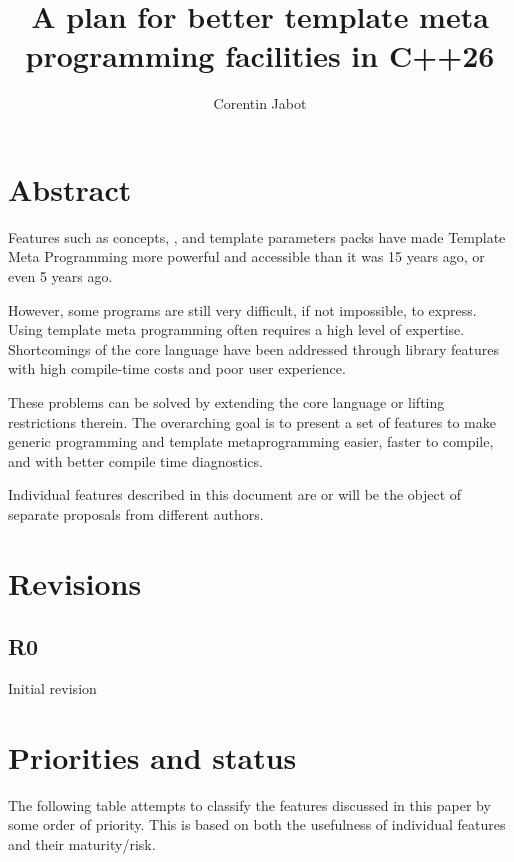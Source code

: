 \documentclass{wg21}
\title{A plan for better template meta programming facilities in C++26}
\author{Corentin Jabot}{corentin.jabot@gmail.com}
\begin{document}
\maketitle
{}

\section{Abstract}

Features such as concepts, , and template parameters packs have made Template Meta Programming more powerful and accessible than it was 15 years ago, or even 5 years ago.

However, some programs are still very difficult, if not impossible, to express. Using template meta programming often requires a high level of expertise.
Shortcomings of the core language have been addressed through library features with high compile-time costs and poor user experience.

These problems can be solved by extending the core language or lifting restrictions therein.
The overarching goal is to present a set of features to make generic programming and template metaprogramming easier, faster to compile, and with better compile time diagnostics.

Individual features described in this document are or will be the object of separate proposals from different authors.

\section{Revisions}

\subsection{R0}

Initial revision

\pagebreak
\setcounter{tocdepth}{2}

\pagebreak

\section{Priorities and status}

The following table attempts to classify the features discussed in this paper by some order of priority.
This is based on both the usefulness of individual features and their maturity/risk.
\end{document}

